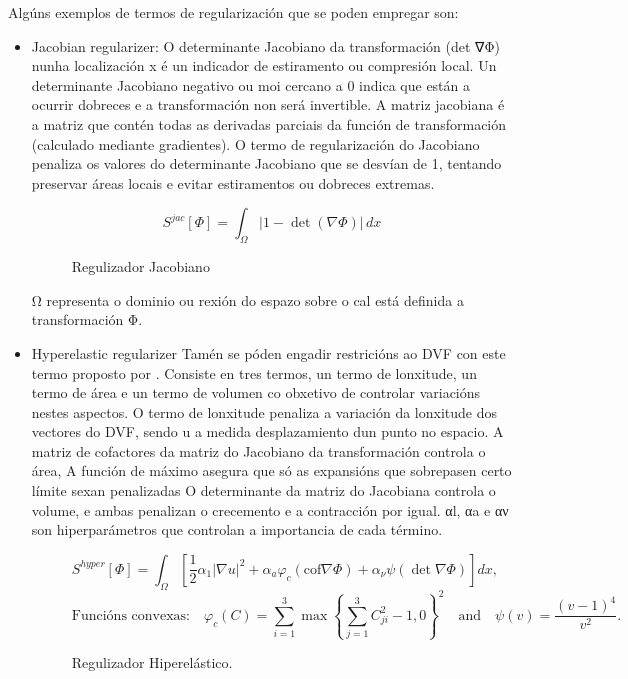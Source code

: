 Algúns exemplos de termos de regularización que se poden empregar son:
\begin{itemize}
    \item Jacobian regularizer: 
    O determinante Jacobiano da transformación (det ∇Φ) nunha localización x é un indicador de estiramento ou compresión local.
    Un determinante Jacobiano negativo ou moi cercano a 0 indica que están a ocurrir dobreces e a transformación non será invertible.
    A matriz jacobiana é a matriz que contén todas as derivadas parciais da función de transformación (calculado mediante gradientes).
    O termo de regularización do Jacobiano penaliza os valores do determinante Jacobiano que se desvían de 1, 
    tentando preservar áreas locais e evitar estiramentos ou dobreces extremas.


    \begin{figure}[tbp]
        \centering
        \[
        S^{jac}[\Phi] = \int_{\Omega} \left| 1 - \det \left( \nabla \Phi \right) \right| \, dx
        \]
        \caption{Regulizador Jacobiano}
    \end{figure}

    Ω representa o dominio ou rexión do espazo sobre o cal está definida a transformación Φ.
    
    \item Hyperelastic regularizer
    Tamén se póden engadir restricións ao DVF con este termo proposto por \cite{HyperelasticRegularization}.
    Consiste en tres termos, un termo de lonxitude, un termo de área e un termo de volumen co obxetivo de controlar variacións nestes aspectos.
    O termo de lonxitude penaliza a variación da lonxitude dos vectores do DVF, sendo u a medida desplazamiento dun punto no espacio.
    A matriz de cofactores da matriz do Jacobiano da transformación controla o área, 
    A función de máximo asegura que só as expansións que sobrepasen certo límite sexan penalizadas
    O determinante da matriz do Jacobiana controla o volume, 
    e ambas penalizan o crecemento e a contracción por igual.
    αl, αa e αν son hiperparámetros que controlan a importancia de cada término.

    \begin{figure}[tbp]
        \centering
        \[
        S^{hyper}[\Phi] = \int_{\Omega} \left[ \frac{1}{2} \alpha_1 |\nabla u|^2 + \alpha_a \varphi_c (\text{cof} \nabla \Phi) + \alpha_\nu \psi(\det \nabla \Phi) \right] dx,
        \]
        \[
        \text{Funcións convexas:} \quad \varphi_c(C) = \sum_{i=1}^3 \max \left\{ \sum_{j=1}^3 C_{ji}^2 - 1, 0 \right\}^2 \quad \text{and} \quad \psi(v) = \frac{(v-1)^4}{v^2}.
        \]
        \caption{Regulizador Hiperelástico.}
    \end{figure}



\end{itemize}
